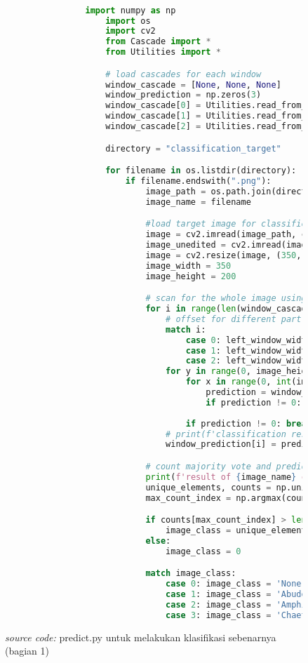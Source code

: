 		\begin{figure}[H]
			\begin{lstlisting}[language=Python, basicstyle=\tiny]

				import numpy as np
					import os
					import cv2
					from Cascade import *
					from Utilities import *

					# load cascades for each window
					window_cascade = [None, None, None]
					window_prediction = np.zeros(3)
					window_cascade[0] = Utilities.read_from_pickle('window_0_cascade') #for left side/mouth detection
					window_cascade[1] = Utilities.read_from_pickle('window_1_cascade') #for mid side/fin detection
					window_cascade[2] = Utilities.read_from_pickle('window_2_cascade') #for right side/tail detection

					directory = "classification_target"

					for filename in os.listdir(directory):
						if filename.endswith(".png"):
							image_path = os.path.join(directory, filename)
							image_name = filename

							#load target image for classification
							image = cv2.imread(image_path, cv2.IMREAD_GRAYSCALE)
							image_unedited = cv2.imread(image_path, cv2.IMREAD_UNCHANGED)
							image = cv2.resize(image, (350, 200))
							image_width = 350
							image_height = 200

							# scan for the whole image using sliding windows
							for i in range(len(window_cascade)):
								# offset for different part all 3 window 
								match i:
									case 0: left_window_width = 0
									case 1: left_window_width = int(image_width / 3)
									case 2: left_window_width = int(image_width / 3 * 2)
								for y in range(0, image_height - 50 + 1):
									for x in range(0, int(image_width / 3) - 50 +1):
										prediction = window_cascade[0].final_cascade_classification(image, x + left_window_width, y)
										if prediction != 0: break
									
									if prediction != 0: break
								# print(f'classification result for window {i}: {prediction}')
								window_prediction[i] = prediction

							# count majority vote and predict class
							print(f'result of {image_name} classification: {window_prediction}')
							unique_elements, counts = np.unique(window_prediction, return_counts=True)
							max_count_index = np.argmax(counts)

							if counts[max_count_index] > len(window_prediction) // 2:
								image_class = unique_elements[max_count_index]
							else:
								image_class = 0

							match image_class:
								case 0: image_class = 'None'
								case 1: image_class = 'Abudefduf'
								case 2: image_class = 'Amphiprion'
								case 3: image_class = 'Chaetodon'

			\end{lstlisting}
			\caption{\emph{source code: } predict.py untuk melakukan klasifikasi sebenarnya (bagian 1)}
			\label{code: predict.py}
		\end{figure}

